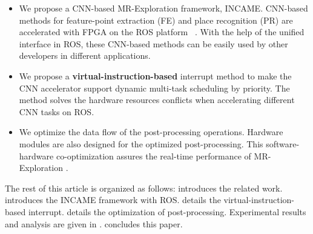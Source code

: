\begin{itemize}
\item We propose a CNN-based MR-Exploration framework, INCAME. CNN-based methods for feature-point extraction (FE) and place recognition (PR) are accelerated with FPGA on the ROS platform ~\cite{quigley2009ros}. With the help of the unified interface in ROS, these CNN-based methods can be easily used by other developers in different applications.
\item We propose a \textbf{virtual-instruction-based} interrupt method to make the CNN accelerator support dynamic multi-task scheduling by priority. The method solves the hardware resources conflicts when accelerating different CNN tasks on ROS.
\item We optimize the data flow of the post-processing operations. Hardware modules are also designed for the optimized post-processing. This software-hardware co-optimization assures the real-time performance of MR-Exploration .
\end{itemize}

The rest of this article is organized as follows:  introduces the related work.  introduces the INCAME framework with ROS.  details the {virtual-instruction-based} interrupt.  details the optimization of post-processing.  Experimental results and analysis are given in .  concludes this paper.